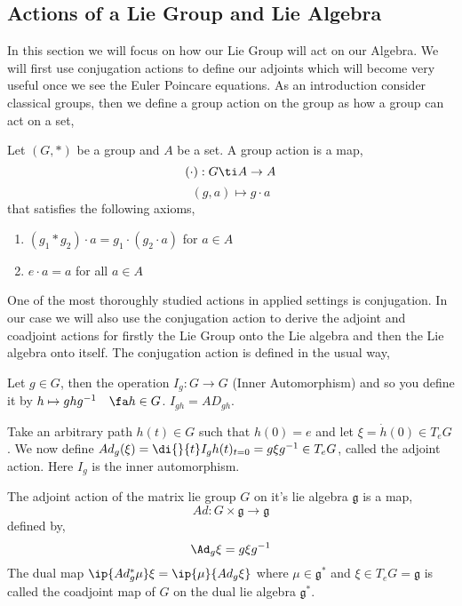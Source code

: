 
\subsection{Actions of a Lie Group and Lie Algebra}
In this section we will focus on how our Lie Group will act on our Algebra. We will first use conjugation actions to define our adjoints which will become very useful once we see the Euler Poincare equations. As an introduction consider classical groups, then we define a group action on the group as how a group can act on a set,
\begin{ndefi}
  Let $(G, *)$ be a group and $A$ be a set. A group action is a map,
  $$ (\cdot) : G \ti A \to A $$
  $$ (g, a) \mapsto g \cdot a $$
  that satisfies the following axioms,
  \begin{enumerate}[(\bfseries{A}1)]
    \item $(g_1 * g_2) \cdot a = g_1 \cdot (g_2 \cdot a)$ for $a \in A$
    \item $e \cdot a = a$ for all $a \in A$
  \end{enumerate}
\end{ndefi}

\noindent
One of the most thoroughly studied actions in applied settings is conjugation. In our case we will also use the conjugation action to derive the adjoint and coadjoint actions for firstly the Lie Group onto the Lie algebra and then the Lie algebra onto itself. The conjugation action is defined in the usual way,

\begin{ndefi}
  Let $g \in G$, then the operation $I_g : G \to G$ (Inner Automorphism) and so you define it by $h \mapsto ghg^{-1}\quad\fa h \in G$. $I_{gh} = AD_{gh}$.
\end{ndefi}

\noindent
Take an arbitrary path $h(t) \in {G}$ such that $h(0) = e$ and let $\xi = \dot h(0) \in T_eG$. We now define $Ad_g(\xi) = \di {}{t} I_g h(t)_{t=0} = g \xi g^{-1} \in T_eG$, called the adjoint action. Here $I_g$ is the inner automorphism.

\begin{ndefi}
  The adjoint action of the matrix lie group $G$ on it's lie algebra $\mathfrak{g}$ is a map,
  $$ Ad : G \times \mathfrak{g} \to \mathfrak{g} $$
  defined by,
  $$ \Ad_g \xi = g\xi g^{-1} $$
  The dual map $\ip {Ad^*_g \mu} \xi = \ip {\mu} {Ad_g\xi}$ where $\mu \in \mathfrak{g}^*$ and $\xi \in T_eG = \mathfrak{g}$ is called the coadjoint map of $G$ on the dual lie algebra $\mathfrak{g}^*$.
\end{ndefi}

